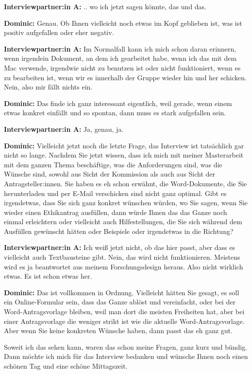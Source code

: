 \documentclass[a4paper,12pt,twoside]{scrreprt}
\begin{document}
\textbf{Interviewpartner:in A:} .. wo ich jetzt sagen könnte, das und das.

\textbf{Dominic:} Genau. Ob Ihnen vielleicht noch etwas im Kopf geblieben ist, was ist positiv aufgefallen oder eher negativ.

\textbf{Interviewpartner:in A:} Im Normalfall kann ich mich schon daran erinnern, wenn irgendein Dokument, an dem ich gearbeitet habe, wenn ich das mit dem Mac verwende, irgendwie nicht zu benutzen ist oder nicht funktioniert, wenn es zu bearbeiten ist, wenn wir es innerhalb der Gruppe wieder hin und her schicken. Nein, also mir fällt nichts ein.

\textbf{Dominic:} Das finde ich ganz interessant eigentlich, weil gerade, wenn einem etwas konkret einfällt und so spontan, dann muss es stark aufgefallen sein.

\textbf{Interviewpartner:in A:} Ja, genau, ja.

\textbf{Dominic:} Vielleicht jetzt noch die letzte Frage, das Interview ist tatsächlich gar nicht so lange. Nachdem Sie jetzt wissen, dass ich mich mit meiner Masterarbeit mit dem ganzen Thema beschäftige, was die Anforderungen sind, was die Wünsche sind, sowohl aus Sicht der Kommission als auch aus Sicht der Antragsteller:innen. Sie haben es eh schon erwähnt, die Word-Dokumente, die Sie herunterladen und per E-Mail verschicken sind nicht ganz optimal. Gibt es irgendetwas, dass Sie sich ganz konkret wünschen würden, wo Sie sagen, wenn Sie wieder einen Ethikantrag ausfüllen, dann würde Ihnen das das Ganze noch einmal erleichtern oder vielleicht auch Hilfestellungen, die Sie sich während dem Ausfüllen gewünscht hätten oder Beispiele oder irgendetwas in die Richtung?

\textbf{Interviewpartner:in A:} Ich weiß jetzt nicht, ob das hier passt, aber dass es vielleicht auch Textbausteine gibt. Nein, das wird nicht funktionieren. Meistens wird es ja beantwortet aus meinem Forschungsdesign heraus. Also nicht wirklich etwas. Es ist schon etwas her.

\textbf{Dominic:} Das ist vollkommen in Ordnung. Vielleicht hätten Sie gesagt, es soll ein Online-Formular sein, dass das Ganze ablöst und vereinfacht, oder bei der Word-Antragsvorlage bleiben, weil man dort die meisten Freiheiten hat, aber bei einer Antragsvorlage die weniger strikt ist wie die aktuelle Word-Antragsvorlage. Aber wenn Sie keine konkreten Wünsche haben, dann passt das eh ganz gut. 

Soweit ich das sehen kann, waren das schon meine Fragen, ganz kurz und bündig. Dann möchte ich mich für das Interview bedanken und wünsche Ihnen noch einen schönen Tag und eine schöne Mittagszeit.
\end{document}
